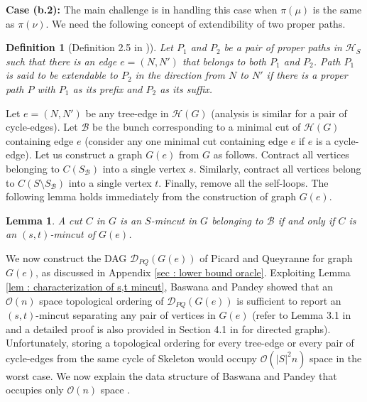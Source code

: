 \documentclass[letterpaper,11pt]{article}
\newtheorem{definition}{Definition}[]
\newtheorem{lemma}{Lemma}[]
\begin{document}
\noindent
\textbf{Case (b.2):} The main challenge is in handling this case when $\pi(\mu)$ is the same as $\pi(\nu)$. We need the following concept of extendibility of two proper paths.
\begin{definition} [Definition 2.5 in \cite{DBLP:conf/soda/BaswanaP22})]
    Let $P_1$ and $P_2$ be a pair of proper paths in ${\mathcal H}_S$ such that there is an edge $e=(N,N')$ that belongs to both $P_1$ and $P_2$. Path $P_1$ is said to be extendable to $P_2$ in the direction from $N$ to $N'$ if there is a proper path $P$ with $P_1$ as its prefix and $P_2$ as its suffix. 
\end{definition}
Let $e=(N,N')$ be any tree-edge in ${\mathcal H}(G)$ (analysis is similar for a pair of cycle-edges). Let ${\mathcal B}$ be the bunch corresponding to a minimal cut of ${\mathcal H}(G)$ containing edge $e$ (consider any one minimal cut containing edge $e$ if $e$ is a cycle-edge). Let us construct a graph $G(e)$ from $G$ as follows. Contract all vertices belonging to $C(S_{\mathcal B})$ into a single vertex $s$. Similarly, contract all vertices belong to $C(S\setminus S_{\mathcal B})$
into a single vertex $t$. Finally, remove all the self-loops. The following lemma holds immediately from the construction of graph $G(e)$.
\begin{lemma} \label{lem : G(e) lemma}
    A cut $C$ in $G$ is an $S$-mincut in $G$ belonging to ${\mathcal B}$ if and only if $C$ is an $(s,t)$-mincut of $G(e)$.
\end{lemma}
We now construct the DAG ${\mathcal D}_{PQ}(G(e))$ of Picard and Queyranne \cite{DBLP:journals/mp/PicardQ80} for graph $G(e)$, as discussed in Appendix \ref{sec : lower bound oracle}. Exploiting Lemma \ref{lem : characterization of s,t mincut}, Baswana and Pandey showed that an ${\mathcal O}(n)$ space topological ordering of ${\mathcal D}_{PQ}(G(e))$ is sufficient to report an $(s,t)$-mincut separating any pair of vertices in $G(e)$ (refer to Lemma 3.1 in \cite{DBLP:conf/soda/BaswanaP22} and a detailed proof is also provided in Section 4.1 in \cite{DBLP:journals/talg/BaswanaBP23} for directed graphs).  Unfortunately, storing a topological ordering for every tree-edge or every pair of cycle-edges from the same cycle of Skeleton would occupy ${\mathcal O}(|S|^2n)$ space in the worst case. We now explain the data structure of Baswana and Pandey \cite{DBLP:conf/soda/BaswanaP22} that occupies only ${\mathcal O}(n)$ space \cite{DBLP:conf/soda/BaswanaP22}.\\
\end{document}
